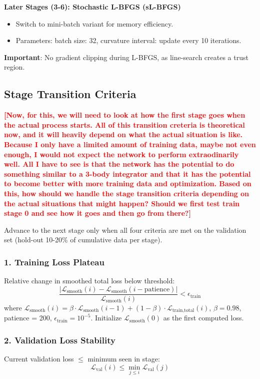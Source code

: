 \documentclass{article}
\newcommand{\authcomment}[1]{\textcolor{Red}{\textbf{[#1]}}}
\begin{document}
\textbf{Later Stages (3-6): Stochastic L-BFGS (sL-BFGS)}
\begin{itemize}
    \item Switch to mini-batch variant for memory efficiency.
    \item Parameters: batch size: 32, curvature interval: update every 10 iterations.
\end{itemize}
\textbf{Important}: No gradient clipping during L-BFGS, as line-search creates a trust region.

\subsection{Stage Transition Criteria}

\authcomment{Now, for this, we will need to look at how the first stage goes when the actual process starts. All of this
transition creteria is theoretical now, and it will heavily depend on what the actual situation is like. Because I only have
a limited amount of training data, maybe not even enough, I would not expect the network to perform extraodinarily well.
All I have to see is that the network has the potential to do something similar to a 3-body integrator and that it has the
potential to become better with more training data and optimization. Based on this, how should we handle the stage transition
criteria depending on the actual situations that might happen? Should we first test train stage 0 and see how it goes and then
go from there?}

Advance to the next stage only when all four criteria are met on the validation set (hold-out 10-20\% of cumulative data per stage).

\subsubsection{1. Training Loss Plateau}
Relative change in smoothed total loss below threshold:
\begin{equation}
\frac{|\mathcal{L}_{\text{smooth}}(i) - \mathcal{L}_{\text{smooth}}(i - \text{patience})|}{\mathcal{L}_{\text{smooth}}(i)} < \epsilon_{\text{train}}
\end{equation}
where $\mathcal{L}_{\text{smooth}}(i) = \beta \cdot \mathcal{L}_{\text{smooth}}(i-1) + (1-\beta) \cdot \mathcal{L}_{\text{train,total}}(i)$, $\beta = 0.98$, patience = 200, $\epsilon_{\text{train}} = 10^{-5}$. Initialize $\mathcal{L}_{\text{smooth}}(0)$ as the first computed loss.

\subsubsection{2. Validation Loss Stability}
Current validation loss $\leq$ minimum seen in stage:
\begin{equation}
\mathcal{L}_{\text{val}}(i) \leq \min_{j \leq i} \mathcal{L}_{\text{val}}(j)
\end{equation}
\end{document}
